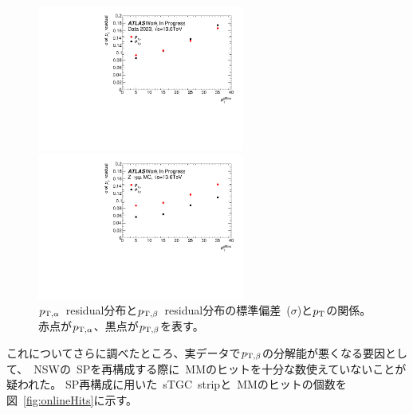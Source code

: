 \begin{figure}[h]
        \begin{minipage}[b]{0.48\linewidth}
            \centering
            \includegraphics[clip, width=6.8cm]{fig/5/pt_alpha_beta_SD.pdf}
        \end{minipage}
        \begin{minipage}[b]{0.48\linewidth}
            \centering
            \includegraphics[clip, width=6.8cm]{fig/5/pt_alpha_beta_SD_MC.pdf}
        \end{minipage}
    \caption{$p_{\mathrm{T}, \alpha}$~residual分布と$p_{\mathrm{T}, \beta}$~residual分布の標準偏差~($\sigma$)と$p_\mathrm{T}$の関係。赤点が$p_{\mathrm{T}, \alpha}$、黒点が$p_{\mathrm{T}, \beta}$を表す。}
    \label{fig:ptresidualSigma}
\end{figure}

これについてさらに調べたところ、実データで$p_{\mathrm{T}, \beta}$の分解能が悪くなる要因として、~NSWの~SPを再構成する際に~MMのヒットを十分な数使えていないことが疑われた。
SP再構成に用いた~sTGC~stripと~MMのヒットの個数を図~\ref{fig:onlineHits}に示す。

